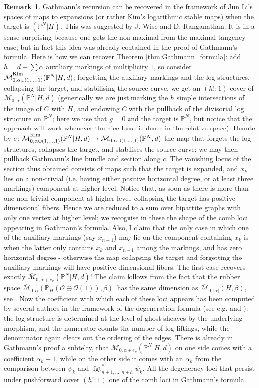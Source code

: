 \documentclass[11pt]{amsart}
\newcommand{\M}[4]{\overline{\mathcal{M}}_{#1,#2}(#3,#4)}
\newcommand{\MK}[4]{\overline{\mathcal{M}}^{\rm{Kim}}_{#1,#2}(#3,#4)}
\newcommand{\PP}{\mathbb P}
\newcommand{\OO}{\mathcal{O}}
\renewcommand{\to}{\rightarrow}
\newcommand{\fgt}{\operatorname{fgt}}
\theoremstyle{definition}
\theoremstyle{definition}
\newtheorem{rmk}[thm]{Remark}
\begin{document}
\begin{rmk}
 Gathmann's recursion can be recovered in the framework of Jun Li's spaces of maps to expansions (or rather Kim's logarithmic stable maps) when the target is $(\PP^N|H)$. This was suggested by J. Wise and D. Ranganathan. It is in a sense surprising because one gets the non-maximal from the maximal tangency case; but in fact this idea was already contained in the proof of Gathmann's formula. Here is how we can recover Theorem \ref{thm:Gathmann_formula}: add $h=d-\sum\alpha$ auxiliary markings of multiplicity $1$, so consider $\MK{0}{\alpha\cup(1,\ldots,1)}{\PP^N|H}{d}$; forgetting the auxiliary markings and the log structures, collapsing the target, and stabilising the source curve, we get an $(h!:1)$ cover of $\M{0}{\alpha}{\PP^N|H}{d}$ (generically we are just marking the $h$ simple intersections of the image of $C$ with $H$, and endowing $C$ with the pullback of the divisorial log structure on $\PP^N$; here we use that $g=0$ and the target is $\PP^N$, but notice that the approach will work whenever the nice locus is dense in the relative space). Denote by $c\colon \MK{0}{\alpha\cup(1,\ldots,1)}{\PP^N|H}{d}\to \M{0}{\alpha\cup(1,\ldots,1)}{\PP^N}{d}$ the map that forgets the log structures, collapses the target, and stabilises the source curve; we may then pullback Gathmann's line bundle and section along $c$. The vanishing locus of the section thus obtained consists of maps such that the target is expanded, and $x_k$ lies on a non-trivial (i.e. having either positive horizontal degree, or at least three markings) component at higher level. Notice that, as soon as there is more than one non-trivial component at higher level, collapsing the target has positive-dimensional fibers. Hence we are reduced to a sum over bipartite graphs with only one vertex at higher level; we recognise in these the shape of the comb loci appearing in Gathmann's formula. Also, I claim that the only case in which one of the auxiliary markings (say $x_{n+1}$) may lie on the component containing $x_k$ is when the latter only contains $x_k$ and $x_{n+1}$ among the markings, and has zero horizontal degree  - otherwise the map collapsing the target and forgetting the auxiliary markings will have positive dimensional fibers. The first case recovers exactly $\M{0}{\alpha+e_k}{\PP^N|H}{d}$! The claim follows from the fact that the rubber space $\M{0}{\alpha}{\PP_H(\OO\oplus\OO(1))}{\beta}\tilde{}\ $ has the same dimension as $\M{0}{\lvert\alpha\rvert}{H}{\beta}$, see \cite[\S 2.4]{GraberVakil}. Now the coefficient with which each of these loci appears has been computed by several authors in the framework of the degeneration formula (see e.g. \cite[Remark 6.3.1.2]{KimLog} and \cite[Equation (1.7)]{KLR}):  the log structure is determined at the level of ghost sheaves by the underlying morphism, and the numerator counts the number of log liftings,  while the denominator again clears out the ordering of the edges. There is already in Gathmann's proof a subtelty, that $\M{0}{\alpha+e_k}{\PP^N|H}{d}$ on one side comes with a coefficient $\alpha_k+1$, while on the other side it comes with an $\alpha_k$ from the comparison between $\psi_k$ and $\fgt_{n+1,\ldots,n+h}^*\psi_k$. All the degeneracy loci that persist under pushforward cover $(h!:1)$ one of the comb loci in Gathmann's formula.

\end{rmk}
\end{document}

